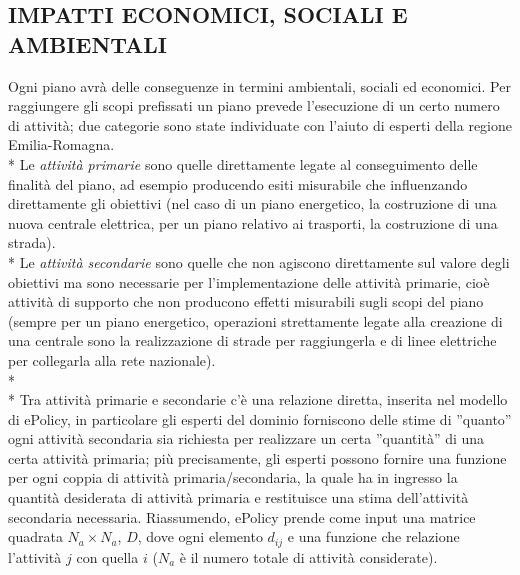 \documentclass[12pt,a4paper,openright,twoside]{report}
\begin{document}
\subsection[IMPATTI]{\nohyphens{IMPATTI ECONOMICI, SOCIALI E AMBIENTALI}}
Ogni piano avrà delle conseguenze in termini ambientali, sociali ed economici. Per raggiungere gli scopi prefissati un piano prevede l'esecuzione di un certo numero di attività; due categorie sono state individuate con l'aiuto di esperti della regione Emilia-Romagna.\\*
Le \emph{attività primarie} sono quelle direttamente legate al conseguimento delle finalità del piano, ad esempio producendo esiti misurabile che influenzando direttamente gli obiettivi (nel caso di un piano energetico, la costruzione di una nuova centrale elettrica, per un piano relativo ai trasporti, la costruzione di una strada).\\*
Le \emph{attività secondarie} sono quelle che non agiscono direttamente sul valore degli obiettivi ma sono necessarie per l'implementazione delle attività primarie, cioè attività di supporto che non producono effetti misurabili sugli scopi del piano (sempre per un piano energetico, operazioni strettamente legate alla creazione di una centrale sono la realizzazione di strade per raggiungerla e di linee elettriche per collegarla alla rete nazionale).\\*\\*
Tra attività primarie e secondarie c'è una relazione diretta, inserita nel modello di ePolicy, in particolare gli esperti del dominio forniscono delle stime di ''quanto'' ogni attività secondaria sia richiesta per realizzare un  certa ''quantità'' di una certa attività primaria; più precisamente, gli esperti possono fornire una funzione per ogni coppia di attività primaria/secondaria, la quale ha in ingresso la quantità desiderata di attività primaria e restituisce una stima dell'attività secondaria necessaria. Riassumendo, ePolicy prende come input una matrice quadrata $N_a \times N_a$, $D$, dove ogni elemento $d_{ij}$ e una funzione che relazione l'attività $j$ con quella $i$ ($N_a$ è il numero totale di attività considerate).
\end{document}
